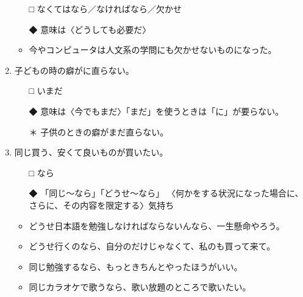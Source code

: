 \documentclass[
uplatex,
b5paper,
10pt,
dvipdfmx
]{jsbook}
\begin{document}
\begin{enumerate}
\begin{itemize}
\item[□] なくてはなら／なければなら／欠かせ
\item[◆] 意味は〈どうしても必要だ〉
\end{itemize}
\begin{itemize}
 \item 今やコンピュータは人文系の学問にも欠かせないものになった。
\end{itemize}

\item 子どもの時の癖が\underline{\hspace{3zw}}に直らない。
\begin{itemize}
 \item[□] いまだ
 \item[◆] 意味は〈今でもまだ〉「まだ」を使うときは「に」が要らない。
 \item[＊] 子供のときの癖がまだ直らない。
\end{itemize}

\item 同じ買う\underline{\hspace{3zw}}、安くて良いものが買いたい。
\begin{itemize}
\item[□] なら
\item[◆] 「同じ〜なら」「どうせ〜なら」 〈何かをする状況になった場合に、
	  さらに、その内容を限定する〉気持ち
\end{itemize}
\begin{itemize}
 \item どうせ日本語を勉強しなければならないんなら、一生懸命やろう。
 \item どうせ行くのなら、自分のだけじゃなくて、私のも買って来て。
 \item 同じ勉強するなら、もっときちんとやったほうがいい。
 \item 同じカラオケで歌うなら、歌い放題のところで歌いたい。 
\end{itemize}


\end{enumerate}
\end{document}
